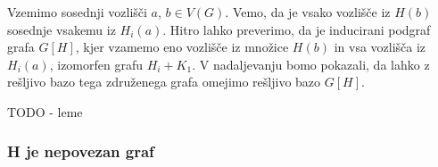 \documentclass[mat1, tisk]{fmfdelo}
\begin{document}
Vzemimo sosednji vozlišči $a$, $b \in V(G)$. Vemo, da je vsako vozlišče iz $H(b)$ 
sosednje vsakemu iz $H_i(a).$ 
Hitro lahko preverimo, da je inducirani podgraf grafa $G[H]$, kjer vzamemo eno 
vozlišče iz množice $H(b)$ in vsa vozlišča iz $H_i(a)$, izomorfen grafu $H_i + K_1.$ 
V nadaljevanju bomo pokazali, da lahko z rešljivo bazo tega združenega grafa
omejimo rešljivo bazo $G[H]$.

TODO - leme


        
        
        





\subsubsection{H je nepovezan graf} \label{sss:nepovezan}
\end{document}
